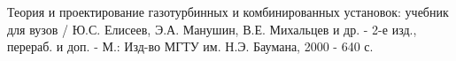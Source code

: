 \documentclass[a4paper,12pt]{article}
\begin{document}
    \newpage
    \begin{thebibliography}{40}


%
%
%
%
%


        Теория и проектирование газотурбинных и комбинированных установок: учебник для вузов /
        Ю.С. Елисеев, Э.А. Манушин, В.Е. Михальцев и др. - 2-е изд., перераб. и доп. - М.:
        Изд-во МГТУ им. Н.Э. Баумана, 2000 - 640 с.

    \end{thebibliography}
\end{document}
